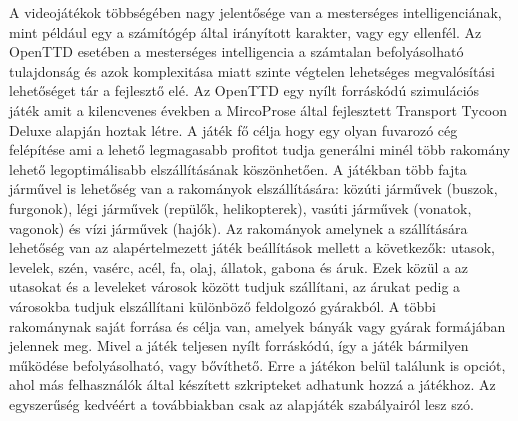 

A videojátékok többségében nagy jelentősége van a mesterséges intelligenciának, mint például egy a számítógép által irányított karakter, vagy egy ellenfél. Az OpenTTD esetében a mesterséges intelligencia a számtalan befolyásolható tulajdonság és azok komplexitása miatt szinte végtelen lehetséges megvalósítási lehetőséget tár a fejlesztő elé.
Az OpenTTD egy nyílt forráskódú szimulációs játék amit a kilencvenes években a MircoProse által fejlesztett Transport Tycoon Deluxe alapján hoztak létre.
A játék fő célja hogy egy olyan fuvarozó cég felépítése ami a lehető legmagasabb profitot tudja generálni minél több rakomány lehető legoptimálisabb elszállításának köszönhetően. A játékban több fajta járművel is lehetőség van a rakományok elszállítására: közúti járművek (buszok, furgonok), légi járművek (repülők, helikopterek), vasúti járművek (vonatok, vagonok) és vízi járművek (hajók). Az rakományok amelynek a szállítására lehetőség van az alapértelmezett játék beállítások mellett a következők: utasok, levelek, szén, vasérc, acél, fa, olaj, állatok, gabona és áruk. Ezek közül a az utasokat és a leveleket városok között tudjuk szállítani, az árukat pedig a városokba tudjuk elszállítani különböző feldolgozó gyárakból. A többi rakománynak saját forrása és célja van, amelyek bányák vagy gyárak formájában jelennek meg. Mivel a játék teljesen nyílt forráskódú, így a játék bármilyen működése befolyásolható, vagy bővíthető. Erre a játékon belül találunk is opciót, ahol más felhasználók által készített szkripteket adhatunk hozzá a játékhoz. Az egyszerűség kedvéért a továbbiakban csak az alapjáték szabályairól lesz szó.


